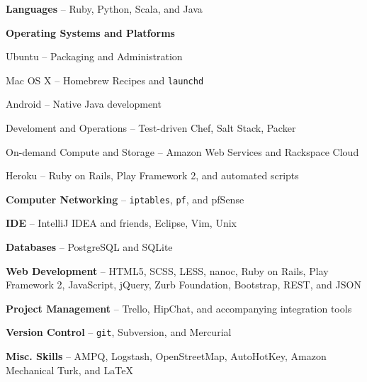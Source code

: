 \documentclass[10pt, letter]{article}
\newcommand{\reference}[4]{
\subsection*{#1 | {\footnotesize{#2}}}
#3 -- \href{mailto:#4}{\texttt{#4}}
}
\newenvironment{packed_item}{
\begin{itemize}
  \setlength{\itemsep}{1pt}
  \setlength{\parskip}{0pt}
  \setlength{\parsep}{0pt}
}{\end{itemize}}
\begin{document}
\begin{multicols}{2}
\begin{packed_item}
    \item \textbf{Languages} -- Ruby, Python, Scala, and Java
    \item \textbf{Operating Systems and Platforms}
        \begin{packed_item}
            \item Ubuntu -- Packaging and Administration
            \item Mac OS X -- Homebrew Recipes and \texttt{launchd}
            \item Android -- Native Java development
            \item Develoment and Operations -- Test-driven Chef, Salt Stack, Packer
            \item On-demand Compute and Storage -- Amazon Web Services and Rackspace Cloud
            \item Heroku -- Ruby on Rails, Play Framework 2, and automated scripts
        \end{packed_item}
    \item \textbf{Computer Networking} -- \texttt{iptables}, \texttt{pf}, and pfSense
    \item \textbf{IDE} -- IntelliJ IDEA and friends, Eclipse, Vim, Unix
    \item \textbf{Databases} -- PostgreSQL and SQLite
    \item \textbf{Web Development} -- HTML5, SCSS, LESS, nanoc, Ruby on Rails, Play Framework 2, JavaScript, jQuery, Zurb Foundation, Bootstrap, REST, and JSON
    \item \textbf{Project Management} -- Trello, HipChat, and accompanying integration tools
    \item \textbf{Version Control} -- \texttt{git}, Subversion, and Mercurial
    \item \textbf{Misc. Skills} -- AMPQ, Logstash, OpenStreetMap, AutoHotKey, Amazon Mechanical Turk, and \LaTeX
\end{packed_item}








\end{multicols}
\end{document}
